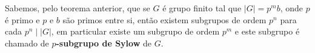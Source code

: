 \begin{definicao}
Sabemos, pelo teorema anterior, que se $G$ {\'e} grupo finito tal que $|G| =
p^m b$, onde $p$ {\'e} primo e $p$ e $b$ s{\~a}o primos entre si, ent{\~a}o
existem subgrupos de ordem $p^n$ para cada $p^n \mid |G|$, em particular
existe um subgrupo de ordem $p^m$ e este subgrupo {\'e} chamado de
\textbf{$p$-subgrupo de Sylow} de $G$.
\end{definicao}




